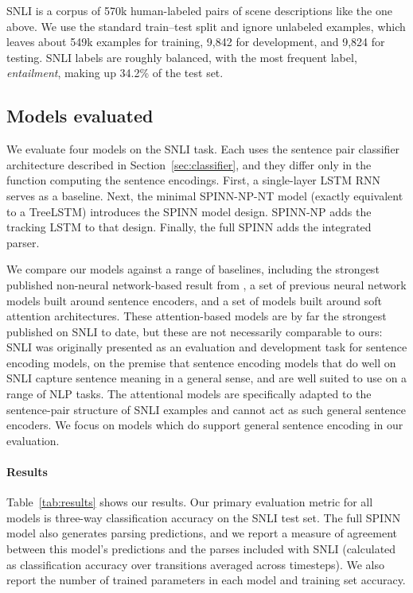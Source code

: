 \documentclass[11pt]{article}
\begin{document}
SNLI is a corpus of 570k human-labeled pairs of scene descriptions like the one above. We use the standard train--test split and ignore unlabeled examples, which leaves about 549k examples for training, 9,842 for development, and 9,824 for testing. SNLI labels are roughly balanced, with the most frequent label, {\it entailment}, making up 34.2\% of the test set.


\subsection{Models evaluated}

We evaluate four models on the SNLI task. Each uses the sentence pair classifier architecture described in Section~\ref{sec:classifier}, and they differ only in the function computing the sentence encodings. First, a single-layer LSTM RNN \citep[similar to that of][]{snli:emnlp2015} serves as a baseline. Next, the minimal SPINN-NP-NT model (exactly equivalent to a TreeLSTM) introduces the SPINN model design. SPINN-NP adds the tracking LSTM to that design. Finally, the full SPINN adds the integrated parser.

We compare our models against a range of baselines, including the strongest published non-neural network-based result from \citep{snli:emnlp2015}, a set of previous neural network models built around sentence encoders, and a set of models built around soft attention architectures. These attention-based models are by far the strongest published on SNLI to date, but these are not necessarily comparable to ours: SNLI was originally presented as an evaluation and development task for sentence encoding models, on the premise that sentence encoding models that do well on SNLI capture sentence meaning in a general sense, and are well suited to use on a range of NLP tasks. The attentional models are specifically adapted to the sentence-pair structure of SNLI examples and cannot act as such general sentence encoders. We focus on models which do support general sentence encoding in our evaluation.

\paragraph{Results} Table~\ref{tab:results} shows our results. Our primary evaluation metric for all models is three-way classification accuracy on the SNLI test set. The full SPINN model also generates parsing predictions, and we report a measure of agreement between this model's predictions and the parses included with SNLI (calculated as classification accuracy over transitions averaged across timesteps). We also report the number of trained parameters in each model and training set accuracy.
\end{document}
